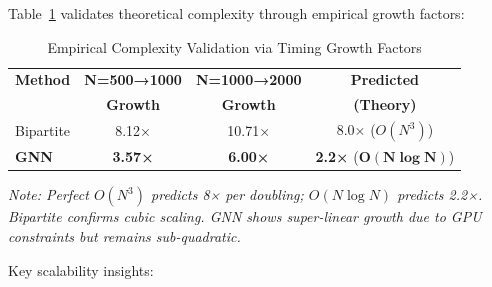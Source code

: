 Table~\ref{tab:timing_growth} validates theoretical complexity through empirical growth factors:

\begin{table}[!t]
\centering
\caption{Empirical Complexity Validation via Timing Growth Factors}
\label{tab:timing_growth}
\begin{tabular}{l c c c}
\toprule
\textbf{Method} & \textbf{N=500→1000} & \textbf{N=1000→2000} & \textbf{Predicted} \\
 & \textbf{Growth} & \textbf{Growth} & \textbf{(Theory)} \\
\midrule
Bipartite & 8.12× & 10.71× & 8.0× ($O(N^3)$) \\
\textbf{GNN} & \textbf{3.57×} & \textbf{6.00×} & \textbf{2.2×} ($\boldsymbol{O(N \log N)}$) \\
\bottomrule
\end{tabular}
\vspace{0.1cm}

\footnotesize{\textit{Note: Perfect $O(N^3)$ predicts 8× per doubling; $O(N \log N)$ predicts 2.2×. Bipartite confirms cubic scaling. GNN shows super-linear growth due to GPU constraints but remains sub-quadratic.}}
\end{table}

Key scalability insights:

